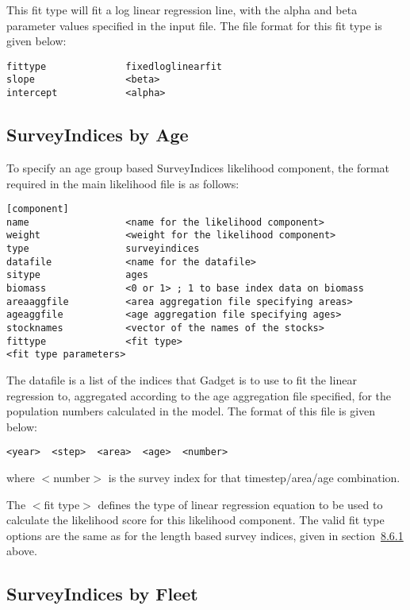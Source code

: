 \documentclass[]{book}
\begin{document}
This fit type will fit a log linear regression line, with the alpha and
beta parameter values specified in the input file. The file format for
this fit type is given below:

\begin{verbatim}
fittype              fixedloglinearfit
slope                <beta>
intercept            <alpha>
\end{verbatim}

\hypertarget{subsec:sibyage}{%
\subsection{SurveyIndices by Age}\label{subsec:sibyage}}

To specify an age group based SurveyIndices likelihood component, the
format required in the main likelihood file is as follows:

\begin{verbatim}
[component]
name                 <name for the likelihood component>
weight               <weight for the likelihood component>
type                 surveyindices
datafile             <name for the datafile>
sitype               ages
biomass              <0 or 1> ; 1 to base index data on biomass
areaaggfile          <area aggregation file specifying areas>
ageaggfile           <age aggregation file specifying ages>
stocknames           <vector of the names of the stocks>
fittype              <fit type>
<fit type parameters>
\end{verbatim}

The datafile is a list of the indices that Gadget is to use to fit the
linear regression to, aggregated according to the age aggregation file
specified, for the population numbers calculated in the model. The
format of this file is given below:

\begin{verbatim}
<year>  <step>  <area>  <age>  <number>
\end{verbatim}

where \(<\)number\(>\) is the survey index for that timestep/area/age
combination.

The \(<\)fit type\(>\) defines the type of linear regression equation to be
used to calculate the likelihood score for this likelihood component.
The valid fit type options are the same as for the length based survey
indices, given in
section~\protect\hyperlink{subsec:sibylength}{8.6.1} above.

\hypertarget{subsec:sibyfleet}{%
\subsection{SurveyIndices by Fleet}\label{subsec:sibyfleet}}
\end{document}
